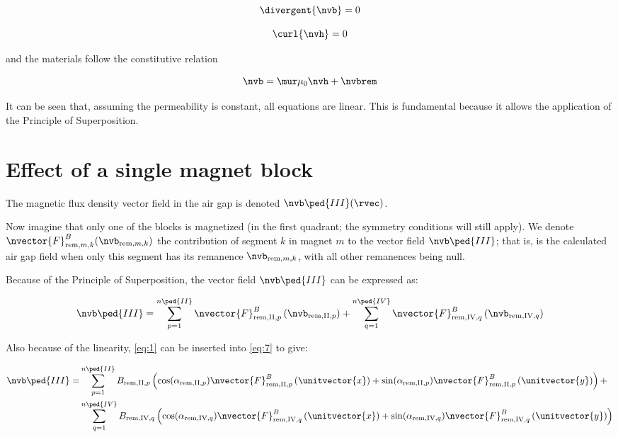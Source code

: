 \documentclass[article,brazil,english]{techreport}
\newcommand{\indexremmk}[2]{\mathrm{rem},{#1},{#2}}
\newcommand{\nvbremmk}[2]{\nvb_{\indexremmk{#1}{#2}}}
\newcommand{\bremmk}[2]{B_{\indexremmk{#1}{#2}}}
\newcommand{\alpharemmk}[2]{\alpha_{\indexremmk{#1}{#2}}}
\newcommand{\nvfremmk}[2]{\nvector{F}^B_{\indexremmk{#1}{#2}}}
\newcommand{\nvbiii}{\nvb\ped{III}}
\begin{document}
\begin{equation}
  \label{eq:4}
  \divergent{\nvb} = 0
\end{equation}

\begin{equation}
  \label{eq:5}
  \curl{\nvh} = 0
\end{equation}

\noindent and the materials follow the constitutive relation

\begin{equation}
  \label{eq:6}
  \nvb = \mur \mu_0 \nvh + \nvbrem
\end{equation}

It can be seen that, assuming the permeability is constant, all equations are linear. This is fundamental because it allows the application of the Principle of Superposition.

\section{Effect of a single magnet block}
\label{sec:effect-single-magnet}

The magnetic flux density vector field in the air gap is denoted $\nvbiii (\rvec)$.

Now imagine that only one of the blocks is magnetized (in the first quadrant; the symmetry conditions will still apply). We denote $\nvfremmk{m}{k}  (\nvbremmk{m}{k} )$ the contribution of segment $k$ in magnet $m$ to the vector field $\nvbiii$; that is, is the calculated air gap field when only this segment has its remanence $\nvbremmk{m}{k}$, with all other remanences being null.

Because of the Principle of Superposition, the vector field $\nvbiii$ can be expressed as:

\begin{equation}
  \label{eq:7}
  \nvbiii = \sum_{p=1}^{n\ped{II}} \nvfremmk{\mathrm{II}}{p} \left(\nvbremmk{\mathrm{II}}{p}\right) + \sum_{q=1}^{n\ped{IV}} \nvfremmk{\mathrm{IV}}{q} \left(\nvbremmk{\mathrm{IV}}{q}\right)
\end{equation}

Also because of the linearity, \autoref{eq:1} can be inserted into \autoref{eq:7} to give:

\begin{equation}
\begin{split}
    \nvbiii = &\sum_{p=1}^{n\ped{II}} \bremmk{\mathrm{II}}{p} \left( \cos(\alpharemmk{\mathrm{II}}{p}) \nvfremmk{\mathrm{II}}{p} \left(\unitvector{x}\right) + \sin(\alpharemmk{\mathrm{II}}{p}) \nvfremmk{\mathrm{II}}{p} \left(\unitvector{y}\right) \right) + \\ 
&\sum_{q=1}^{n\ped{IV}} \bremmk{\mathrm{IV}}{q} \left( \cos(\alpharemmk{\mathrm{IV}}{q}) \nvfremmk{\mathrm{IV}}{q} \left(\unitvector{x}\right) + \sin(\alpharemmk{\mathrm{IV}}{q}) \nvfremmk{\mathrm{IV}}{q} \left(\unitvector{y}\right) \right) 
\end{split}
  \label{eq:8}
\end{equation}
\end{document}
